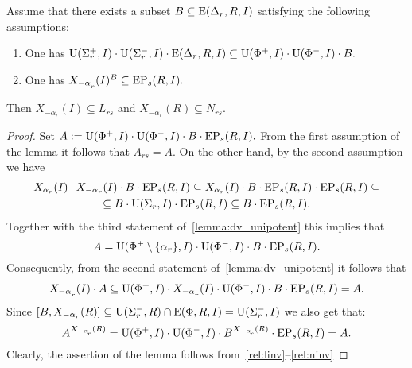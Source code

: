 \begin{lemma}\label{lemma:Stein_reduction}
Assume that there exists a subset $B \subseteq \operatorname{E}(\Delta_r, R, I)$ satisfying the following assumptions:
\begin{enumerate}
 \item\label{stein_cond1} One has $\operatorname{U}(\Sigma^+_r, I)\cdot \operatorname{U}(\Sigma^-_r, I) \cdot \operatorname{E}(\Delta_r, R, I) \subseteq \operatorname{U}(\Phi^+, I)\cdot \operatorname{U}(\Phi^-, I) \cdot B.$
 \item\label{stein_cond2} One has $X_{-\alpha\ssub{r}}(I)^B \subseteq \EP_s(R, I).$
\end{enumerate}
Then $X_{-\alpha_r}(I) \subseteq L_{rs}$ and $X_{-\alpha_r}(R) \subseteq N_{rs}.$
\end{lemma}
\begin{proof} Set $A:=\operatorname{U}(\Phi^+, I)\cdot \operatorname{U}(\Phi^-, I) \cdot B \cdot \operatorname{EP}_s(R, I).$
From the first assumption of the lemma it follows that $A_{rs}=A$.
On the other hand, by the second assumption we have
\begin{multline*} X_{\alpha_r}(I) \cdot X_{-\alpha_r}(I) \cdot B \cdot \operatorname{EP}_s(R, I) \subseteq 
 X_{\alpha_r}(I) \cdot B \cdot \operatorname{EP}_s(R, I) \cdot \operatorname{EP}_s(R, I) \subseteq \\
 \subseteq B \cdot \operatorname{U}(\Sigma_r, I) \cdot \operatorname{EP}_s(R, I) \subseteq 
 B \cdot \operatorname{EP}_s(R, I). \end{multline*}
Together with the third statement of~\cref{lemma:dv_unipotent} this implies that
\begin{equation} \label{rel:sred} A = \operatorname{U}(\Phi^+\setminus\{\alpha_r\}, I) \cdot \operatorname{U}(\Phi^-, I) \cdot B \cdot \operatorname{EP}_s(R, I). \end{equation}
Consequently, from the second statement of~\cref{lemma:dv_unipotent} it follows that
\begin{equation} \label{rel:linv} X_{-\alpha\ssub{r}}(I) \cdot A \subseteq \U(\Phi^+, I) \cdot X_{-\alpha\ssub{r}}(I) \cdot \U(\Phi^-, I) \cdot B \cdot \EP_s(R, I) = A. \end{equation}
Since $[B, X_{-\alpha_r}(R)] \subseteq \operatorname{U}(\Sigma_r^-, R) \cap \operatorname{E}(\Phi, R, I) = \operatorname{U}(\Sigma_r^-, I)$ we also get that:
\begin{equation} \label{rel:ninv} A^{X_{-\alpha\ssub{r}}(R)} = \U(\Phi^+, I) \cdot \U(\Phi^-, I) \cdot B ^{X_{-\alpha\ssub{r}}(R)} \cdot \EP_s(R, I) = A. \end{equation}
Clearly, the assertion of the lemma follows from~\ref{rel:linv}--\ref{rel:ninv}
\end{proof}


